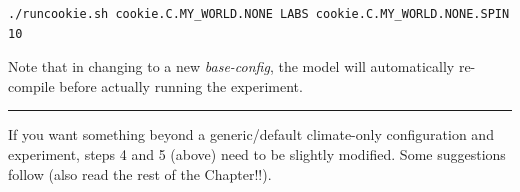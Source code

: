 \vspace{-2mm}\small\begin{verbatim}
./runcookie.sh cookie.C.MY_WORLD.NONE LABS cookie.C.MY_WORLD.NONE.SPIN 10
\end{verbatim}\normalsize\vspace{-2mm}
Note that in changing to a new \textit{base-config}, the model will automatically re-compile before actually running the experiment.

\vspace{1mm}\noindent\rule{4cm}{0.5pt}\vspace{2mm}

\noindent If you want something beyond a generic/default climate-only configuration and experiment, steps 4 and 5 (above) need to be slightly modified. Some suggestions follow (also read the rest of the Chapter!!).

